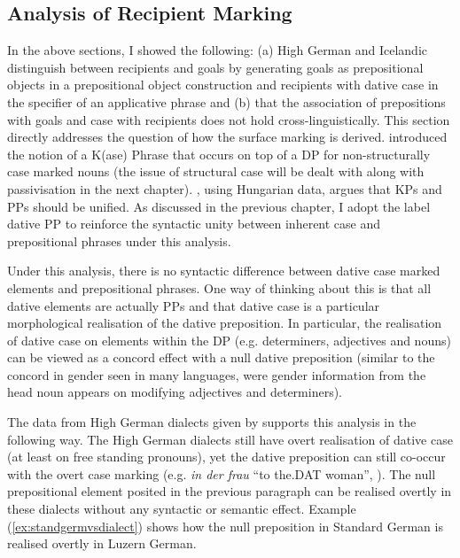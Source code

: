 	\subsection{Analysis of Recipient Marking}
	In the above sections, I showed the following: (a) High German and Icelandic distinguish between recipients and goals by generating goals as prepositional objects in a prepositional object construction and recipients with dative case in the specifier of an applicative phrase and (b) that the association of prepositions with goals and case with recipients does not hold cross-linguistically. This section directly addresses the question of how the surface marking is derived. \cite{Bayer.2001} introduced the notion of a K(ase) Phrase that occurs on top of a DP for non-structurally case marked nouns (the issue of structural case will be dealt with along with passivisation in the next chapter). \cite{Asbury.2005}, using Hungarian data, argues that KPs and PPs should be unified. As discussed in the previous chapter, I adopt the label dative PP to reinforce the syntactic unity between inherent case and prepositional phrases under this analysis.

	Under this analysis, there is no syntactic difference between dative case marked elements and prepositional phrases. One way of thinking about this is that all dative elements are actually PPs \citep{Bittner.1996,Caha.2009,Alexiadou.2014} and that dative case is a particular morphological realisation of the dative preposition. In particular, the realisation of dative case on elements within the DP (e.g. determiners, adjectives and nouns) can be viewed as a concord effect with a null dative preposition (similar to the concord in gender seen in many languages, were gender information from the head noun appears on modifying adjectives and determiners).

	The data from High German dialects given by \cite{Seiler.2001,Seiler.2003} supports this analysis in the following way. The High German dialects still have overt realisation of dative case (at least on free standing pronouns), yet the dative preposition can still co-occur with the overt case marking (e.g. \textit{in der frau} ``to the.DAT woman'', \citealt[ex 3]{Seiler.2001}). The null prepositional element posited in the previous paragraph can be realised overtly in these dialects without any syntactic or semantic effect. Example (\ref{ex:standgermvsdialect}) shows how the null preposition in Standard German is realised overtly in Luzern German.

